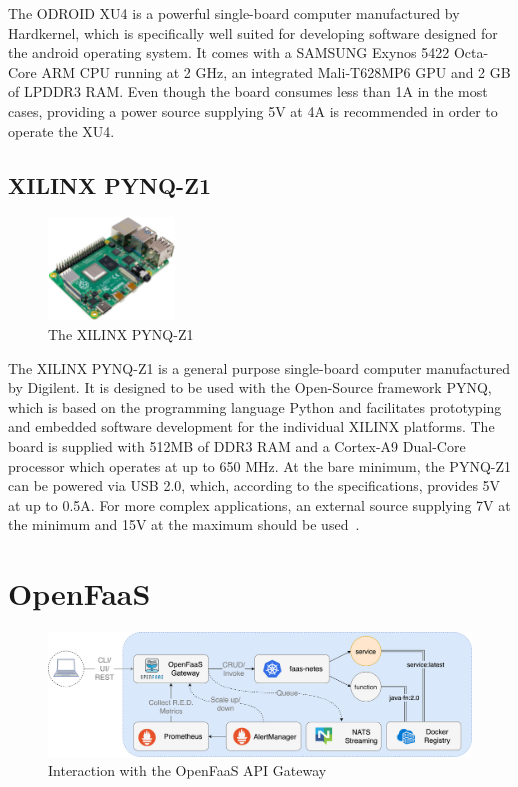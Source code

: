 The ODROID XU4 is a powerful single-board computer manufactured by Hardkernel, which is specifically well suited for developing software designed for the android operating system. It comes with a SAMSUNG Exynos 5422 Octa-Core ARM CPU running at 2 GHz, an integrated Mali-T628MP6 GPU and 2 GB of LPDDR3 RAM. Even though the board consumes less than 1A in the most cases, providing a power source supplying 5V at 4A is recommended in order to operate the XU4.~\parencite{odroid-xu4-manual}

\subsection{XILINX PYNQ-Z1}

\begin{figure}[h]
    \centering
    \includegraphics[width=0.30\textwidth]{./figures/mesh}
    \caption{The XILINX PYNQ-Z1}
    \label{fig:xilinx-pynq-z1}
\end{figure}

The XILINX PYNQ-Z1 is a general purpose single-board computer manufactured by Digilent. It is designed to be used with the Open-Source framework PYNQ, which is based on the programming language Python and facilitates prototyping and embedded software development for the individual XILINX platforms. The board is supplied with 512MB of DDR3 RAM and a Cortex-A9 Dual-Core processor which operates at up to 650 MHz. At the bare minimum, the PYNQ-Z1 can be powered via USB 2.0, which, according to the specifications, provides 5V at up to 0.5A. For more complex applications, an external source supplying 7V at the minimum and 15V at the maximum should be used~\parencite{pynq-z1-manual}.

\section{OpenFaaS}

\begin{figure}[h]
    \centering
    \includegraphics[width=1\textwidth]{./figures/of-workflow.png}
    \caption{Interaction with the OpenFaaS API Gateway~\parencite{openfaas-stack}}
    \label{fig:openfaas-gateway}
\end{figure}

